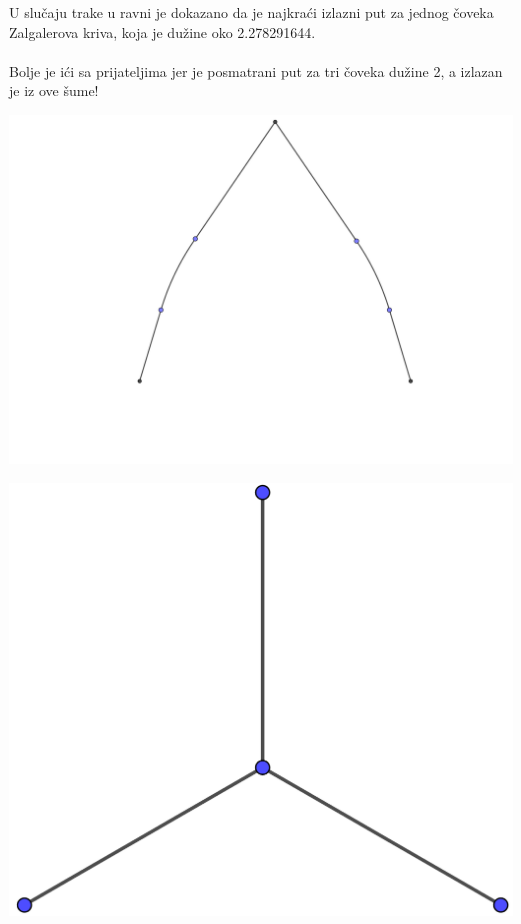 \documentclass[b1paper,portrait]{template/baposter}
\begin{document}
\begin{poster}
{
	
	U slu\v caju trake u ravni je dokazano da je najkra\' ci izlazni  put za jednog \v coveka Zalgalerova kriva, koja je du\v zine oko 2.278291644. 
	\\ 
	\\
 	Bolje je i\' ci sa prijateljima jer je posmatrani put za tri \v coveka du\v zine 2, a izlazan je iz ove \v sume!
	\begin{center}
		\begin{minipage}{0.25\linewidth}
			\includegraphics[width=\linewidth]{Zalgaller}
		\end{minipage}
		\hspace{30pt}
		\begin{minipage}{0.25\linewidth}
			\includegraphics[width=\linewidth]{Y}
		\end{minipage}
	\end{center}
	\vspace{0.15cm}
}


\end{poster}
\end{document}
